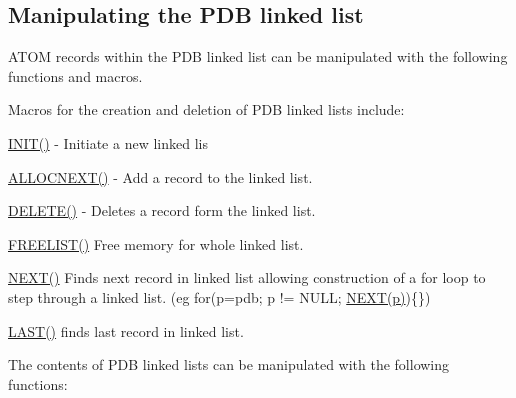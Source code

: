 \subsection*{Manipulating the P\-D\-B linked list }

A\-T\-O\-M records within the P\-D\-B linked list can be manipulated with the following functions and macros.

Macros for the creation and deletion of P\-D\-B linked lists include\-:


\begin{DoxyItemize}
\item \hyperlink{macros_8h_aa167d4937e9a8d9a33c3e93bbcad8a35}{I\-N\-I\-T()} -\/ Initiate a new linked lis
\item \hyperlink{macros_8h_ae0a46a92b4865dd29e1ea9e0a4d64772}{A\-L\-L\-O\-C\-N\-E\-X\-T()} -\/ Add a record to the linked list.
\item \hyperlink{macros_8h_ab866ee223048678a3d417c2e786576e4}{D\-E\-L\-E\-T\-E()} -\/ Deletes a record form the linked list.
\item \hyperlink{macros_8h_a4151f4e24778e7b290ec804c29c91f27}{F\-R\-E\-E\-L\-I\-S\-T()} Free memory for whole linked list.
\item \hyperlink{macros_8h_a184eb1eeb21deade2e180823b4a0e04c}{N\-E\-X\-T()} Finds next record in linked list allowing construction of a for loop to step through a linked list. (eg for(p=pdb; p != N\-U\-L\-L; \hyperlink{macros_8h_a184eb1eeb21deade2e180823b4a0e04c}{N\-E\-X\-T(p)})\{\})
\item \hyperlink{macros_8h_a49dd722216353daa94f49c2dbb53e0cb}{L\-A\-S\-T()} finds last record in linked list.
\end{DoxyItemize}

The contents of P\-D\-B linked lists can be manipulated with the following functions\-:



